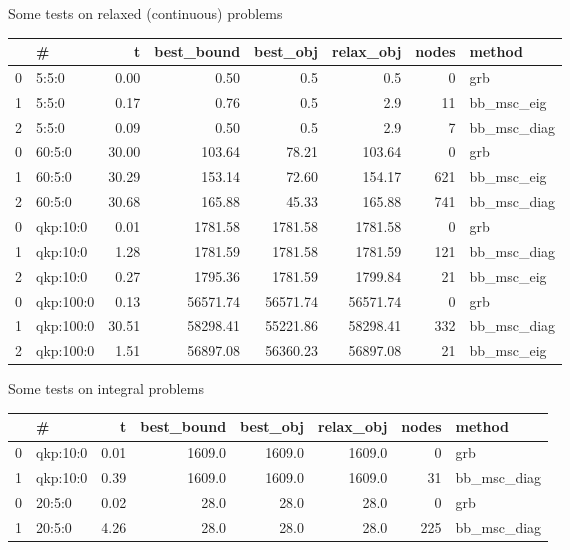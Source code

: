 \begin{frame}{Some tests on relaxed (continuous) problems}
  \scriptsize
  \begin{tabular}{llrrrrrl}
    \toprule
    {} & \#        & t     & best\_bound & best\_obj & relax\_obj & nodes & method        \\
    \midrule
    0  & 5:5:0     & 0.00  & 0.50        & 0.5       & 0.5        & 0     & grb           \\
    1  & 5:5:0     & 0.17  & 0.76        & 0.5       & 2.9        & 11    & bb\_msc\_eig  \\
    2  & 5:5:0     & 0.09  & 0.50        & 0.5       & 2.9        & 7     & bb\_msc\_diag \\
    0  & 60:5:0    & 30.00 & 103.64      & 78.21     & 103.64     & 0     & grb           \\
    1  & 60:5:0    & 30.29 & 153.14      & 72.60     & 154.17     & 621   & bb\_msc\_eig  \\
    2  & 60:5:0    & 30.68 & 165.88      & 45.33     & 165.88     & 741   & bb\_msc\_diag \\
    0  & qkp:10:0  & 0.01  & 1781.58     & 1781.58   & 1781.58    & 0     & grb           \\
    1  & qkp:10:0  & 1.28  & 1781.59     & 1781.58   & 1781.59    & 121   & bb\_msc\_diag \\
    2  & qkp:10:0  & 0.27  & 1795.36     & 1781.59   & 1799.84    & 21    & bb\_msc\_eig  \\
    0  & qkp:100:0 & 0.13  & 56571.74    & 56571.74  & 56571.74   & 0     & grb           \\
    1  & qkp:100:0 & 30.51 & 58298.41    & 55221.86  & 58298.41   & 332   & bb\_msc\_diag \\
    2  & qkp:100:0 & 1.51  & 56897.08    & 56360.23  & 56897.08   & 21    & bb\_msc\_eig  \\
    \bottomrule
  \end{tabular}
  \scriptsize
\end{frame}
\begin{frame}{Some tests on integral problems}
  \scriptsize
  \begin{tabular}{llrrrrrl}
    \toprule
    {} & \#       & t    & best\_bound & best\_obj & relax\_obj & nodes & method        \\
    \midrule
    0  & qkp:10:0 & 0.01 & 1609.0      & 1609.0    & 1609.0     & 0     & grb           \\
    1  & qkp:10:0 & 0.39 & 1609.0      & 1609.0    & 1609.0     & 31    & bb\_msc\_diag \\
    0  & 20:5:0   & 0.02 & 28.0        & 28.0      & 28.0       & 0     & grb           \\
    1  & 20:5:0   & 4.26 & 28.0        & 28.0      & 28.0       & 225   & bb\_msc\_diag \\
    \bottomrule
  \end{tabular}
  \scriptsize
\end{frame}

